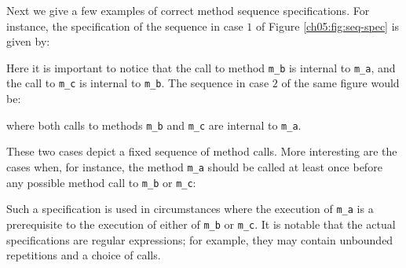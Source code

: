Next we give a few examples of correct method sequence specifications. 
For instance, the specification of the sequence in case $1$ of
Figure \ref{ch05:fig:seq-spec} is given by:

Here it is important to notice that the call to method  \texttt{m\_b} is internal
to \texttt{m\_a}, and the call to \texttt{m\_c} is internal to \texttt{m\_b}.
The sequence in case $2$ of the same figure would be:

where both calls to methods  \texttt{m\_b} and \texttt{m\_c} are internal to
\texttt{m\_a}.

These two cases depict a fixed sequence of method calls. More interesting are the cases when,
for instance, the method \texttt{m\_a} should be called at least once before any possible
method call to \texttt{m\_b} or \texttt{m\_c}:


Such a specification is used in circumstances where the execution of  \texttt{m\_a} is a prerequisite to the execution of either of \texttt{m\_b} or \texttt{m\_c}.
% 
It is notable that the actual specifications are regular expressions;
for example, they may contain  unbounded repetitions and a choice of calls.

